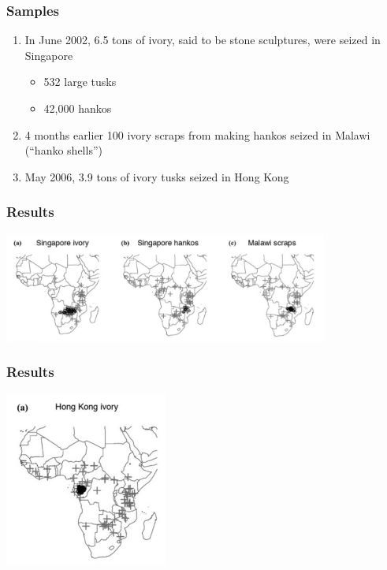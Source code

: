 \documentclass[10pt]{beamer}
\begin{document}
\begin{frame}[t]
\frametitle{Samples}
\vspace{0.5cm}
	
	\begin{enumerate}
		\item In June 2002, 6.5 tons of ivory, said to be stone sculptures, were seized in Singapore
		\medskip
			\begin{itemize}
				\item 532 large tusks
				\medskip
				\item 42,000 hankos
			\end{itemize}
		\bigskip
		\item 4 months earlier 100 ivory scraps from making hankos seized in Malawi (``hanko shells'')
		\bigskip
		\item May 2006, 3.9 tons of ivory tusks seized in Hong Kong	
	\end{enumerate}
	
\end{frame}


\begin{frame}[t]
\frametitle{Results}
\vspace{0.5cm}
	
	\begin{center}
		\includegraphics[width=0.8\textwidth]{figures/wasser_map3.png}
	\end{center}
	
\end{frame}


\begin{frame}[t]
\frametitle{Results}
\vspace{0.5cm}
	
	\begin{center}
		\includegraphics[width=0.4\textwidth]{figures/wasser_map4.png}
	\end{center}
	
\end{frame}
\end{document}
